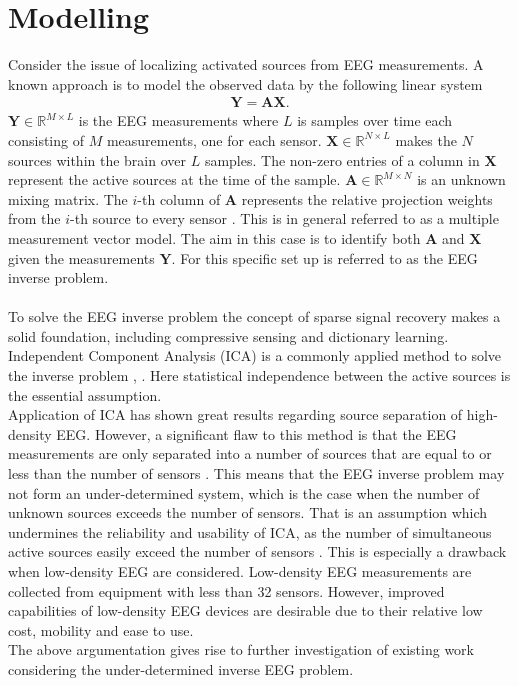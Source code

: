 \section{Modelling}
Consider the issue of localizing activated sources from EEG measurements. A known approach is to model the observed data by the following linear system 
\begin{align*}
\mathbf{Y} = \mathbf{AX}.
\end{align*}
$\mathbf{Y} \in \mathbb{R}^{M \times L}$ is the EEG measurements where $L$ is samples over time each consisting of $M$ measurements, one for each sensor. $\mathbf{X} \in \mathbb{R}^{N \times L}$ makes the $N$ sources within the brain over $L$ samples. The non-zero entries of a column in $\textbf{X}$ represent the active sources at the time of the sample. $\mathbf{A} \in \mathbb{R}^{M \times N}$ is an unknown mixing matrix. 
The $i$-th column of $\mathbf{A}$ represents the relative projection weights from the $i$-th source to every sensor \cite{phd2015}. 
This is in general referred to as a multiple measurement vector model. 
The aim in this case is to identify both $\mathbf{A}$ and $\mathbf{X}$ given the measurements $\mathbf{Y}$. 
For this specific set up is referred to as the EEG inverse problem.  
\\ \\
To solve the EEG inverse problem the concept of sparse signal recovery makes a solid foundation, including compressive sensing and dictionary learning. 
Independent Component Analysis (ICA) is a commonly applied method to solve the inverse problem \cite{Scott1996}, \cite{Scott1997}. Here statistical independence between the active sources is the essential assumption. 
\\
Application of ICA has shown great results regarding source separation of high-density EEG. 
However, a significant flaw to this method is that the EEG measurements are only separated into a number of sources that are equal to or less than the number of sensors \cite{Balkan2015}.
This means that the EEG inverse problem may not form an under-determined system, which is the case when the number of unknown sources exceeds the number of sensors. 
That is an assumption which undermines the reliability and usability of ICA, as the number of simultaneous active sources easily exceed the number of sensors \cite{phd2015}. 
This is especially a drawback when low-density EEG are considered. Low-density EEG measurements are collected from equipment with less than 32 sensors. 
However, improved capabilities of low-density EEG devices are desirable due to their relative low cost, mobility and ease to use. 
\\
The above argumentation gives rise to further investigation of existing work considering the under-determined inverse EEG problem. 

